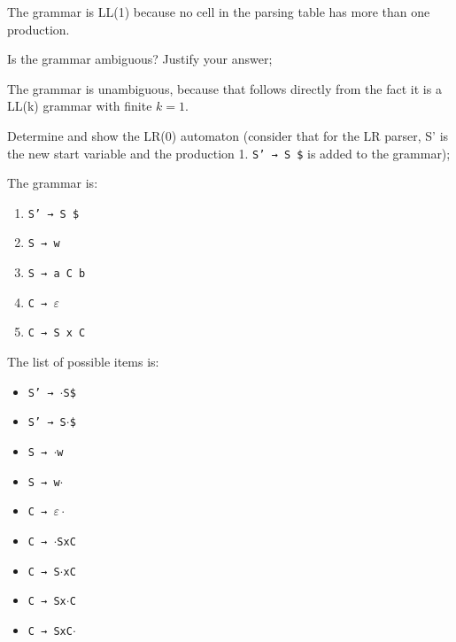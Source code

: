 \documentclass[docid=2019]{comp_exam_round2}
\begin{document}
The grammar is LL(1) because no cell in the parsing table has more than one production.

\question
Is the grammar ambiguous? Justify your answer;

\ansseparator

\noindent
The grammar is unambiguous, because that follows directly from the fact it is a LL(k) grammar with finite $k=1$.

\question
Determine and show the LR(0) automaton (consider that for the LR parser, S' is the new start variable and the production 1. \texttt{S' → S \$} is added to the grammar);

\ansseparator

\begin{minipage}[t]{0.49\textwidth}
The grammar is:
\begin{enumerate}
    \item \texttt{S' → S \$}
    \item \texttt{S → w}
    \item \texttt{S → a C b}
    \item \texttt{C → $\varepsilon$}
    \item \texttt{C → S x C}
\end{enumerate}
\end{minipage}
\begin{minipage}[t]{0.49\textwidth}
The list of possible items is:
\begin{itemize}[wide, noitemsep]
    \item \texttt{S' → $\cdot$S\$}
    \item \texttt{S' → S$\cdot$\$}
    \item \texttt{S → $\cdot$w}
    \item \texttt{S → w$\cdot$}
    \item \texttt{C → $\varepsilon\cdot$}
    \item \texttt{C → $\cdot$SxC}
    \item \texttt{C → S$\cdot$xC}
    \item \texttt{C → Sx$\cdot$C}
    \item \texttt{C → SxC$\cdot$}
\end{itemize}
\end{minipage}
\end{document}
